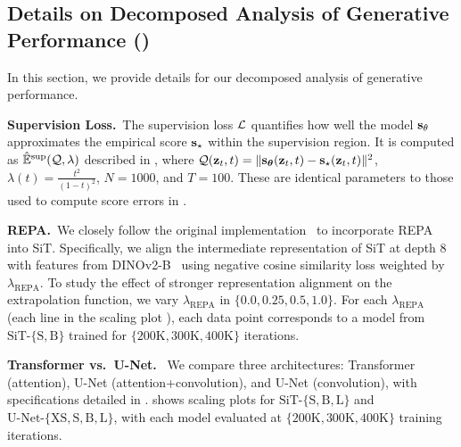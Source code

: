 \subsection{Details on Decomposed Analysis of Generative Performance ()}

In this section, we provide details for our decomposed analysis of generative performance.

\textbf{Supervision Loss.}~The supervision loss $\mathcal{L}$ quantifies how well the model ${\mathbf{s}}_\theta$ approximates the empirical score ${\mathbf{s}}_\star$ within the supervision region. It is computed as $\hat{\mathbb{E}}^\text{sup}({\mathcal{Q}}, \lambda)$ described in , where ${\mathcal{Q}}({\mathbf{z}}_t, t) = \|{\mathbf{s}}_{\boldsymbol{\theta}}({\mathbf{z}}_t, t) - {\mathbf{s}}_\star({\mathbf{z}}_t, t)\|^2$, $\lambda(t) = \frac{t^2}{(1 - t)^2}$, $N = 1000$, and $T = 100$. These are identical parameters to those used to compute score errors in .

\textbf{REPA.}~We closely follow the original implementation~\citep{yu2024representation} to incorporate REPA into SiT. Specifically, we align the intermediate representation of SiT at depth 8 with features from DINOv2-B~\citep{oquab2023dinov2} using negative cosine similarity loss weighted by $\lambda_\text{REPA}$. To study the effect of stronger representation alignment on the extrapolation function, we vary $\lambda_\text{REPA}$ in $\{0.0, 0.25, 0.5, 1.0\}$. For each $\lambda_\text{REPA}$ (each line in the scaling plot ), each data point corresponds to a model from $\text{SiT-}\{\text{S}, \text{B}\}$ trained for $\{200\text{K}, 300\text{K}, 400\text{K}\}$ iterations.

\textbf{Transformer vs.\ U-Net.}~ We compare three architectures: Transformer (attention), U-Net (attention+convolution), and U-Net (convolution), with specifications detailed in .  shows scaling plots for $\text{SiT-}\{\text{S}, \text{B}, \text{L}\}$ and $\text{U-Net-}\{\text{XS}, \text{S}, \text{B}, \text{L}\}$, with each model evaluated at $\{200\text{K}, 300\text{K}, 400\text{K}\}$ training iterations.


